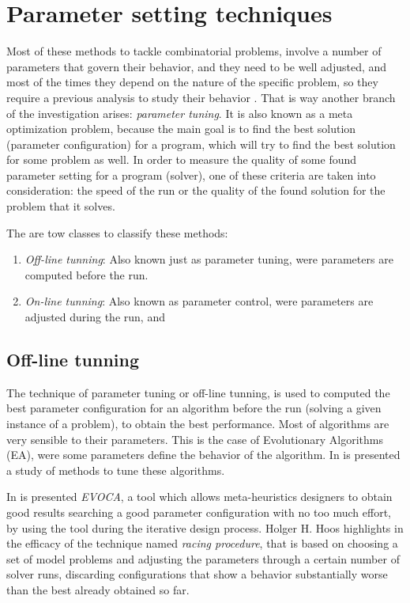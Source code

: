 \section{Parameter setting techniques}
\label{sec:tunning}

Most of these methods to tackle combinatorial problems, involve a number of parameters that govern their behavior, and they need to be well adjusted, and most of the times they depend on the nature of the specific problem, so they require a previous analysis to study their behavior \cite{Birattari2005}. That is way another branch of the investigation arises: {\it parameter tuning}. It is also known as a meta optimization problem, because the main goal is to find the best solution (parameter configuration) for a program, which will try to find the best solution for some problem as well. In order to measure the quality of some found parameter setting for a program (solver), one of these criteria are taken into consideration: the speed of the run or the quality of the found solution for the problem that it solves.

The are tow classes to classify these methods: 
\begin{enumerate}
\item \textit{Off-line tunning}: Also known just as parameter tuning, were parameters are computed before the run.
\item \textit{On-line tunning}: Also known as parameter control, were parameters are adjusted during the run, and
\end{enumerate}

\subsection{Off-line tunning}

The technique of parameter tuning or off-line tunning, is used to computed the best parameter configuration for an algorithm before the run (solving a given instance of a problem), to obtain the best performance. Most of algorithms are very sensible to their parameters. This is the case of Evolutionary Algorithms (EA), were some parameters define the behavior of the algorithm. In \cite{A.E.Eiben2012} is presented a study of methods to tune these algorithms.

In \cite{Riff2013} is presented \textit{EVOCA}, a tool which allows meta-heuristics designers to obtain good results searching a good parameter configuration with no too much effort, by using the tool during the iterative design process. Holger H. Hoos highlights in \cite{Hoos2012} the efficacy of the technique named {\it racing procedure}, that is based on choosing a set of model problems and adjusting the parameters through a certain number of solver runs, discarding configurations that show a behavior substantially worse than the best already obtained so far. 


